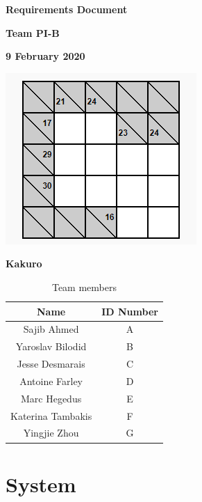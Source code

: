 \documentclass[12pt]{article}
\begin{document}
\graphicspath{{C:/Users/Marc/Desktop/ReqDocFolder/}}

\vspace*{0.5in}
\centerline{\bf\Large Requirements Document}

\vspace*{0.5in}
\centerline{\bf\Large Team PI-B}

\vspace*{0.5in}
\centerline{\bf\Large 9 February 2020}

\vspace*{1.0in}
\centerline{\includegraphics[scale=.75]{KakuroTemp.png}}
\centerline{\bf\Large Kakuro}

\vspace*{0.5in}
\begin{table}[htbp]
\begin{center}
\caption*{Team members}
\begin{tabular}{|c | c|}
\hline
\cellcolor{gray}Name & \cellcolor{gray}ID Number \\
\hline
Sajib Ahmed & A \\
\hline
Yaroslav Bilodid & B \\
\hline
Jesse Desmarais & C \\
\hline
Antoine Farley & D \\
\hline
Marc Hegedus & E \\
\hline
Katerina Tambakis & F \\
\hline
Yingjie Zhou & G \\
\hline
\end{tabular}
\end{center}
\end{table}

\clearpage

\section{System}
\end{document}
